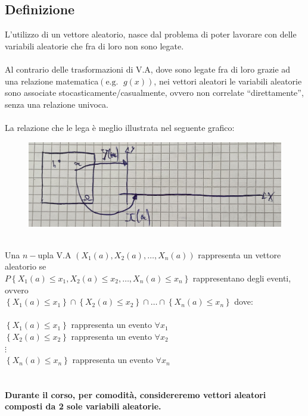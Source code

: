 \documentclass{article}
\begin{document}
\subsection{Definizione}
L’utilizzo di un vettore aleatorio, nasce dal problema di poter lavorare con delle variabili aleatorie che fra di loro non sono legate. \\ \\
Al contrario delle trasformazioni di V.A, dove sono legate fra di loro grazie ad una relazione matematica$\left( \text{e.g. } \; g(x) \right)$, nei vettori aleatori le variabili aleatorie sono associate stocasticamente/casualmente, ovvero non correlate “direttamente”, senza una relazione univoca. \\ \\
La relazione che le lega è meglio illustrata nel seguente grafico:
\begin{figure}[ht]
\centering
\includegraphics[scale=0.16]{images/69.VettAlea.jpeg}
\end{figure} ~\\
Una $n-$upla V.A $\left( X_1(a), X_2(a), \dots , X_n(a) \right)$ rappresenta un vettore aleatorio se \\ 
$P \left\{ X_1(a) \leq x_1, X_2(a) \leq x_2, \dots , X_n(a) \leq x_n \right\}$ rappresentano degli eventi, ovvero \\
$\left\{ X_1(a) \leq x_1 \right\} \cap \left\{ X_2(a) \leq x_2 \right\} \cap \dots \cap \left\{ X_n(a) \leq x_n \right\}$ dove: \\ \\
$\left\{ X_1(a) \leq x_1 \right\}$ rappresenta un evento $\forall x_1$ \\
$\left\{ X_2(a) \leq x_2 \right\}$ rappresenta un evento $\forall x_2$ \\
$\vdots$ \\
$\left\{ X_n(a) \leq x_n \right\}$ rappresenta un evento $\forall x_n$ \\ \\ \\
\textbf{Durante il corso, per comodità, considereremo vettori aleatori composti da 2 sole variabili aleatorie.}
\end{document}
